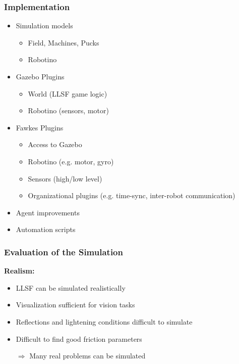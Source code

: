 \documentclass[]{beamer}
\begin{document}
\begin{frame}
  \frametitle{Implementation}
    \begin{itemize}
    \item Simulation models
      \begin{itemize}
      \item Field, Machines, Pucks
      \item Robotino
      \end{itemize}
    \item Gazebo Plugins
      \begin{itemize}
      \item World (LLSF game logic)
      \item Robotino (sensors, motor)
      \end{itemize}
    \item Fawkes Plugins
      \begin{itemize}
      \item Access to Gazebo
      \item Robotino (e.g. motor, gyro) 
      \item Sensors (high/low level)
      \item Organizational plugins (e.g. time-sync, inter-robot communication) %
      \end{itemize}
    \item Agent improvements
    \item Automation scripts
    \end{itemize}
\end{frame}

\begin{frame}
  \frametitle{Evaluation of the Simulation}
  \textbf{\large Realism:}\\
  \begin{itemize}
  \item LLSF can be simulated realistically
  \item Visualization sufficient for vision tasks %
  \item Reflections and lightening conditions difficult to simulate %
  \item Difficult to find good friction parameters
  \item[$\Rightarrow$] Many real problems can be simulated
  \end{itemize}
\end{frame}
\end{document}
